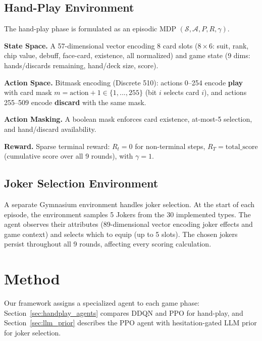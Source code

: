 \documentclass[conference]{IEEEtran}
\begin{document}
\subsection{Hand-Play Environment}
\label{sec:handplay_env}

The hand-play phase is formulated as an episodic MDP $(\mathcal{S}, \mathcal{A}, P, R, \gamma)$.

\textbf{State Space.}
A 57-dimensional vector encoding 8 card slots ($8 \times 6$: suit, rank, chip value, debuff, face-card, existence, all normalized) and game state (9 dims: hands/discards remaining, hand/deck size, score).

\textbf{Action Space.}
Bitmask encoding (Discrete 510): actions 0--254 encode \textbf{play} with card mask $m = \text{action}+1 \in \{1,...,255\}$ (bit $i$ selects card $i$), and actions 255--509 encode \textbf{discard} with the same mask.

\textbf{Action Masking.}
A boolean mask enforces card existence, at-most-5 selection, and hand/discard availability.

\textbf{Reward.}
Sparse terminal reward: $R_t = 0$ for non-terminal steps, $R_T = \text{total\_score}$ (cumulative score over all 9 rounds), with $\gamma = 1$.

\subsection{Joker Selection Environment}

A separate Gymnasium environment handles joker selection. At the start of each episode, the environment samples 5 Jokers from the 30 implemented types. The agent observes their attributes (89-dimensional vector encoding joker effects and game context) and selects which to equip (up to 5 slots). The chosen jokers persist throughout all 9 rounds, affecting every scoring calculation.

\section{Method}
\label{sec:method}

Our framework assigns a specialized agent to each game phase: Section~\ref{sec:handplay_agents} compares DDQN and PPO for hand-play, and Section~\ref{sec:llm_prior} describes the PPO agent with hesitation-gated LLM prior for joker selection.
\end{document}
